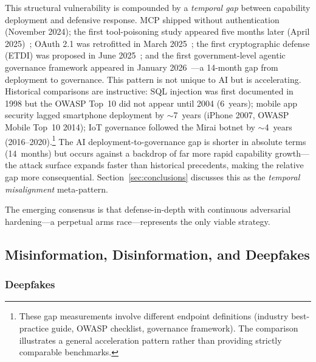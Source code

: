 This structural vulnerability is compounded by a \emph{temporal gap} between capability deployment and defensive response. MCP shipped without authentication (November 2024); the first tool-poisoning study appeared five months later (April 2025)~\cite{invariant2025toolpoisoning}; OAuth 2.1 was retrofitted in March 2025~\cite{mcpspec2025}; the first cryptographic defense (ETDI) was proposed in June 2025~\cite{bhatt2025etdi}; and the first government-level agentic governance framework appeared in January 2026~\cite{imda2026agentic}---a 14-month gap from deployment to governance. This pattern is not unique to AI but is accelerating. Historical comparisons are instructive: SQL injection was first documented in 1998 but the OWASP Top~10 did not appear until 2004 (6~years); mobile app security lagged smartphone deployment by $\sim$7~years (iPhone 2007, OWASP Mobile Top~10 2014); IoT governance followed the Mirai botnet by $\sim$4~years (2016--2020).\footnote{These gap measurements involve different endpoint definitions (industry best-practice guide, OWASP checklist, governance framework). The comparison illustrates a general acceleration pattern rather than providing strictly comparable benchmarks.} The AI deployment-to-governance gap is shorter in absolute terms (14~months) but occurs against a backdrop of far more rapid capability growth---the attack surface expands faster than historical precedents, making the relative gap more consequential. Section~\ref{sec:conclusions} discusses this as the \emph{temporal misalignment} meta-pattern.

The emerging consensus is that defense-in-depth with continuous adversarial hardening---a perpetual arms race---represents the only viable strategy.


\subsection{Misinformation, Disinformation, and Deepfakes}
\label{sec:threat-misinfo}

\subsubsection{Deepfakes}
\label{sec:threat-deepfake}


